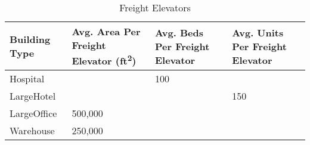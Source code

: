 \begin{table}
\small
\centering
\caption[Freight Elevators]{Freight Elevators}
\label{tab:freight_elevators}
\begin{tabular}{|p{1.5in}|p{1in}|p{1in}|p{1in}|}
\hline
\textbf{Building Type} & \textbf{Avg. Area Per Freight Elevator   (ft\textsuperscript{2})} & \textbf{Avg. Beds Per Freight Elevator} & \textbf{Avg. Units Per Freight Elevator} \\ \hline
{Hospital}        &          & 100       &      \\ \hline
{LargeHotel}      &          &           & 150  \\ \hline
{LargeOffice}     & 500,000  &           &      \\ \hline
{Warehouse}       & 250,000  &           &      \\ \hline
\end{tabular}
\end{table}

